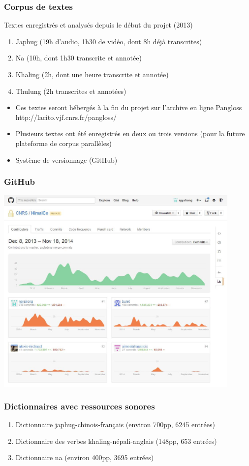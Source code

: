 \documentclass[xcolor=table]{beamer}
\newcommand{\bleu}[1]{{\color{blue}#1}}
\begin{document}
 \begin{frame} 
 \frametitle{Corpus de textes}
 
Textes enregistrés et analysés depuis le début du projet (2013)
\begin{enumerate}[<+->]
\item Japhug (19h d'audio, 1h30 de vidéo, dont 8h déjà transcrites)
\item  Na (10h, dont 1h30 transcrite et annotée)
\item  Khaling (2h, dont une heure transcrite et annotée)
\item  Thulung (2h transcrites et annotées)
\end{enumerate}

\begin{itemize}[<+->]
\item  Ces textes seront hébergés à la fin du projet sur l'archive en ligne Pangloss \bleu{http://lacito.vjf.cnrs.fr/pangloss/}
 
\item Plusieurs textes ont été enregistrés en deux ou trois versions (pour la future plateforme de corpus parallèles)

\item Système de versionnage (GitHub)
\end{itemize}
 \end{frame} 
   \begin{frame} 
 \frametitle{GitHub}
 
   \includegraphics[width=0.9\textwidth]{github.jpg} \centering
   
   \end{frame}    
  \begin{frame} 
 \frametitle{Dictionnaires avec ressources sonores}
 
\begin{enumerate}[<+->]
\item Dictionnaire japhug-chinois-français (environ 700pp, 6245 entrées)
\item  Dictionnaire des verbes khaling-népali-anglais (148pp, 653 entrées)
\item  Dictionnaire na (environ 400pp, 3695 entrées)

\end{enumerate}
  \end{frame}    
 
\end{document}
